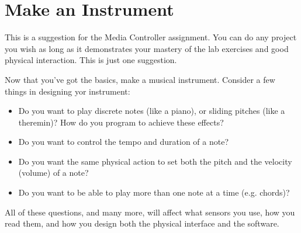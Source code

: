 \section{Make an Instrument}

This is a suggestion for the Media Controller assignment. You can do any project you wish as long as it demonstrates your mastery of the lab exercises and good physical interaction. This is just one suggestion.

Now that you've got the basics, make a musical instrument. Consider a few things in designing yor instrument:

\begin{itemize}
\item Do you want to play discrete notes (like a piano), or sliding pitches (like a theremin)? How do you program to achieve these effects?
\item Do you want to control the tempo and duration of a note?
\item Do you want the same physical action to set both the pitch and the velocity (volume) of a note?
\item Do you want to be able to play more than one note at a time (e.g. chords)?
\end{itemize}

All of these questions, and many more, will affect what sensors you use, how you read them, and how you design both the physical interface and the software.
